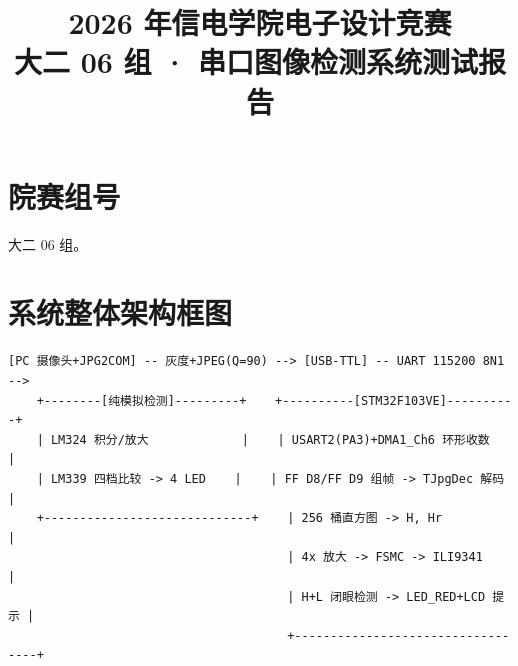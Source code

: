 \documentclass[a4paper]{article}
\title{\vspace{-2.5em}\Large\bfseries 2026 年信电学院电子设计竞赛\\大二 06 组 · 串口图像检测系统测试报告}
\date{}
\begin{document}
\maketitle
\vspace{-3em}

\section{院赛组号}
大二 06 组。

\section{系统整体架构框图}

\begin{center}
\begin{minipage}{0.98\textwidth}
\footnotesize
\begin{verbatim}
[PC 摄像头+JPG2COM] -- 灰度+JPEG(Q=90) --> [USB-TTL] -- UART 115200 8N1 -->
    +--------[纯模拟检测]---------+    +----------[STM32F103VE]----------+
    | LM324 积分/放大             |    | USART2(PA3)+DMA1_Ch6 环形收数    |
    | LM339 四档比较 -> 4 LED    |    | FF D8/FF D9 组帧 -> TJpgDec 解码 |
    +-----------------------------+    | 256 桶直方图 -> H, Hr           |
                                       | 4x 放大 -> FSMC -> ILI9341       |
                                       | H+L 闭眼检测 -> LED_RED+LCD 提示 |
                                       +----------------------------------+
\end{verbatim}
\end{minipage}
\end{center}
\end{document}
